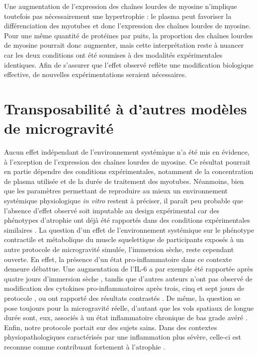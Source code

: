 \documentclass[11pt]{report}
\begin{document}
Une augmentation de l'expression des chaînes lourdes de myosine n'implique toutefois pas nécessairement une hypertrophie : le plasma peut favoriser la différenciation des myotubes et donc l'expression des chaînes lourdes de myosine. Pour une même quantité de protéines par puits, la proportion des chaînes lourdes de myosine pourrait donc augmenter, mais cette interprétation reste à nuancer car les deux conditions ont été soumises à des modalités expérimentales identiques. Afin de s'assurer que l'effet observé reflète une modification biologique effective, de nouvelles expérimentations seraient nécessaires.

\section{Transposabilité à d'autres modèles de microgravité}

Aucun effet indépendant de l'environnement systémique n'a été mis en évidence, à l'exception de l'expression des chaînes lourdes de myosine. Ce résultat pourrait en partie dépendre des conditions expérimentales, notamment de la concentration de plasma utilisée et de la durée de traitement des myotubes. Néanmoins, bien que les paramètres permettant de reproduire au mieux un environnement systémique physiologique \textit{in vitro} restent à préciser, il paraît peu probable que l'absence d'effet observé soit imputable au design expérimental car des phénotypes d'atrophie ont déjà été rapportés dans des conditions expérimentales similaires \parencite{Allen2022Dec}. La question d'un effet de l'environnement systémique sur le phénotype contractile et métabolique du muscle squelettique de participants exposés à un autre protocole de microgravité simulée, l'immersion sèche, reste cependant ouverte. En effet, la présence d'un état pro-inflammatoire dans ce contexte demeure débattue. Une augmentation de l'IL-6 a par exemple été rapportée après quatre jours d'immersion sèche \parencite{Twomey2021Nov}, tandis que d'autres auteurs n'ont pas observé de modification des cytokines pro-inflammatoires après trois, cinq et sept jours de protocole \parencite{Moser2026Feb,Berendeeva2011Dec}, ou ont rapporté des résultats contrastés \parencite{fovet_early_2021}. De même, la question se pose toujours pour la microgravité réelle, d'autant que les vols spatiaux de longue durée sont, eux, associés à un état inflammatoire chronique de bas grade avéré \parencite{Crucian2014Oct,Buchheim2019Feb,Krieger2021Aug}. Enfin, notre protocole portait sur des sujets sains. Dans des contextes physiopathologiques caractérisés par une inflammation plus sévère, celle-ci est reconnue comme contribuant fortement à l'atrophie \parencite{Puthucheary2013Oct,Fazzini2023Dec,mehdi_endocrine_2025,Damanti2024Oct}.
\end{document}
